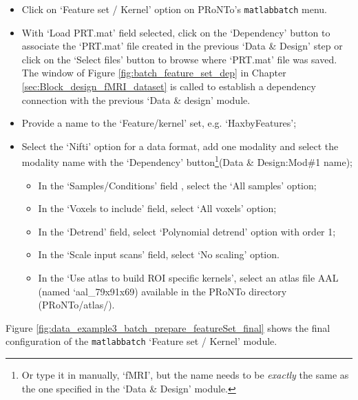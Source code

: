 \begin{itemize}
	\item Click on `Feature set / Kernel' option on PRoNTo's {\tt matlabbatch} menu.
	
	\item With `Load PRT.mat' field selected, click on the `Dependency' button to associate the `PRT.mat' file created in the previous `Data \& Design' step or click on the `Select files' button to browse where `PRT.mat' file was saved. The window of Figure \ref{fig:batch_feature_set_dep} in Chapter \ref{sec:Block_design_fMRI_dataset} is called to establish a dependency connection with the previous `Data \& design' module.

	\item Provide a name to the `Feature/kernel' set, e.g. `HaxbyFeatures';
	
	\item Select the `Nifti' option for a data format, add one modality and select the modality name with the `Dependency' button\footnote{Or type it in manually, `fMRI', but the name needs to be {\it exactly} the same as the one specified in the `Data \& Design' module.}(Data \& Design:Mod\#1 name);
	
		\begin{itemize}
	
	\item In the `Samples/Conditions' field , select the `All samples' option;
	
	\item In the `Voxels to include' field, select `All voxels' option;
	
	\item In the `Detrend' field, select `Polynomial detrend' option with order 1;
	
	\item In the `Scale input scans' field, select `No scaling' option.
	
	\item In the `Use atlas to build ROI specific kernels', select an atlas file AAL (named `aal\_79x91x69) available in the PRoNTo directory (PRoNTo/atlas/).
 	
	\end{itemize}
	
\end{itemize}

    Figure \ref{fig:data_example3_batch_prepare_featureSet_final} shows the final configuration of the {\tt matlabbatch} `Feature set / Kernel' module.
	

